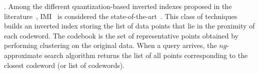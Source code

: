 

. Among the different quantization-based inverted indexes proposed in the literature~\cite{journal/tpami/jegou2011,conf/icassp/jegou2011,journal/iccv/xia2013,journal/pami/babenko15}, IMI~\cite{journal/tpami/ge2014,journal/pami/babenko15} is considered the state-of-the-art~\cite{journal/ite/matsui2018}. 
This class of techniques builds an inverted index storing the list of data points that lie in the proximity of each codeword. 
The codebook
is the set of representative points obtained by performing clustering on the original data. When a query arrives, the $ng$-approximate search algorithm returns the list of all points corresponding to the closest codeword (or list of codewords).

